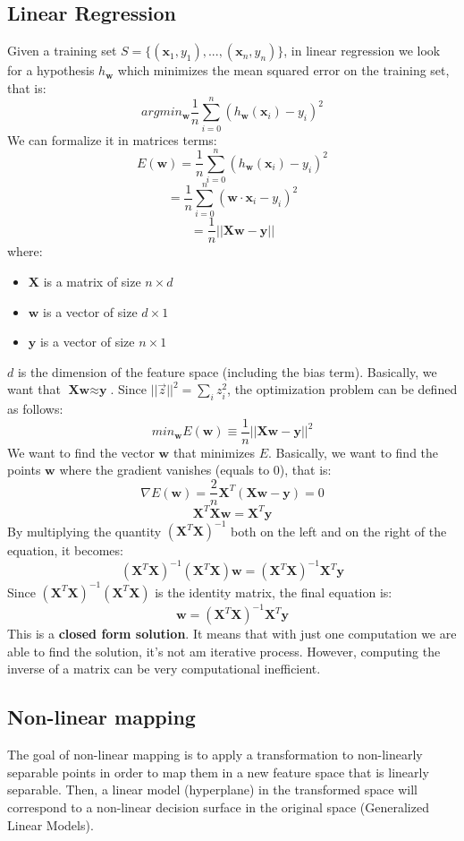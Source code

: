 \subsection{Linear Regression}
Given a training set $S = \{(\textbf{x}_{1}, y_{1}), ..., (\textbf{x}_{n}, y_{n})\}$, in linear regression we look for a hypothesis $h_{\textbf{w}}$ which minimizes the mean squared error on the training set, that is:
\[argmin_{\textbf{w}} \frac{1}{n}\sum_{i=0}^{n}(h_{\textbf{w}}(\textbf{x}_{i}) - y_{i})^{2}\]
We can formalize it in matrices terms:
\[E(\textbf{w}) = \frac{1}{n}\sum_{i=0}^{n}(h_{\textbf{w}}(\textbf{x}_{i}) - y_{i})^{2}\]
\[= \frac{1}{n}\sum_{i=0}^{n}(\textbf{w} \cdot \textbf{x}_{i} - y_{i})^{2}\]
\[= \frac{1}{n}||\textbf{Xw} - \textbf{y}||\]
where:
\begin{itemize}
    \item $\textbf{X}$ is a matrix of size $n \times d$
    \item $\textbf{w}$ is a vector of size $d \times 1$
    \item $\textbf{y}$ is a vector of size $n \times 1$
\end{itemize}
$d$ is the dimension of the feature space (including the bias term). Basically, we want that $\textbf{Xw} \approx \textbf{y}$.\newline\newline
Since $||\vec{z}||^{2} = \sum_{i}z_{i}^{2}$, the optimization problem can be defined as follows:
\[min_{\textbf{w}}E(\textbf{w}) \equiv \frac{1}{n}||\textbf{Xw} - \textbf{y}||^{2}\]
We want to find the vector $\textbf{w}$ that minimizes $E$. Basically, we want to find the points $\textbf{w}$ where the gradient vanishes (equals to 0), that is:
\[\nabla E(\textbf{w}) = \frac{2}{n}\textbf{X}^{T} (\textbf{Xw} - \textbf{y}) = 0\]
\[\textbf{X}^{T}\textbf{Xw} = \textbf{X}^{T}\textbf{y}\]
By multiplying the quantity $(\textbf{X}^{T}\textbf{X})^{-1}$ both on the left and on the right of the equation, it becomes:
\[(\textbf{X}^{T}\textbf{X})^{-1}(\textbf{X}^{T}\textbf{X})\textbf{w} = (\textbf{X}^{T}\textbf{X})^{-1}\textbf{X}^{T}\textbf{y}\]
Since $(\textbf{X}^{T}\textbf{X})^{-1}(\textbf{X}^{T}\textbf{X})$ is the identity matrix, the final equation is:
\[\textbf{w} = (\textbf{X}^{T}\textbf{X})^{-1}\textbf{X}^{T}\textbf{y}\]
This is a \textbf{closed form solution}. It means that with just one computation we are able to find the solution, it's not am iterative process. However, computing the inverse of a matrix can be very computational inefficient.

\subsection{Non-linear mapping}
The goal of non-linear mapping is to apply a transformation to non-linearly separable points in order to map them in a new feature space that is linearly separable. Then, a linear model (hyperplane) in the transformed space will correspond to a non-linear decision surface in the original space (Generalized Linear Models).

